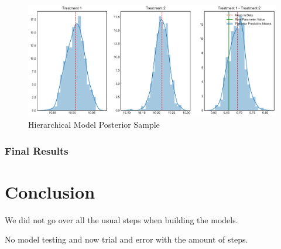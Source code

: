 \documentclass[12pt,a4paper,leqno]{report}
\theoremstyle{plain}
\theoremstyle{definition}
\theoremstyle{remark}
\begin{document}
\begin{figure}[!h]
    \caption{Hierarchical Model Posterior Sample}
    \includegraphics[width=\textwidth,height=\textheight,keepaspectratio]{hierarchical_model_posterior_sampling.pdf}
\end{figure}

\subsection{Final Results}

\chapter{Conclusion}

We did not go over all the usual steps when building the models.

No model testing and now trial and error with the amount of steps.

\end{document}
